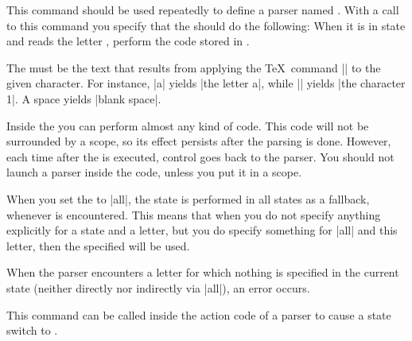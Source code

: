 \begin{command}{\pgfparserdef{}}
  This command should be used repeatedly to define a parser named
  . With a call to this command you specify that the
   should do the following: When it is in state
   and reads the letter , perform the
  code stored in .

  The  must be the text that results from
  applying the \TeX\ command |\meaning| to the given character. For
  instance, |\meaning a| yields |the letter a|, while ||
  yields |the character 1|. A space yields |blank space|.

  Inside the  you can perform almost any kind of
  code. This code will not be surrounded by a scope, so its effect
  persists after the parsing is done. However, each time after the
   is executed, control goes back to the parser. You
  should not launch a parser inside the  code, unless you
  put it in a scope.

  When you set the  to |all|, the state  is
  performed in all states as a fallback, whenever  is encountered. This means that when you do not specify
  anything explicitly for a state and a letter, but you do specify
  something for |all| and this letter, then the specified
   will be used.

  When the parser encounters a letter for which nothing is specified
  in the current state (neither directly nor indirectly via |all|), an
  error occurs.
\end{command}

\begin{command}{\pgfparserswitch{}}
  This command can be called inside the action code of a parser to
  cause a state switch to .
\end{command}
